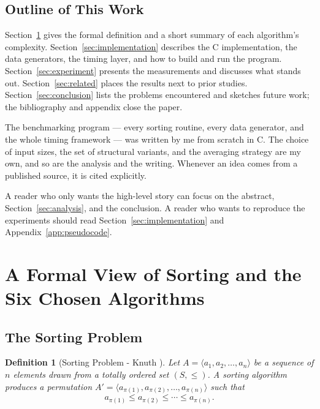 \documentclass[11pt,a4paper]{article}
\newtheorem{definition}{Definition}
\begin{document}
\subsection{Outline of This Work}

Section~\ref{sec:formal} gives the formal definition and a short summary of each algorithm's complexity. Section~\ref{sec:implementation} describes the C implementation, the data generators, the timing layer, and how to build and run the program. Section~\ref{sec:experiment} presents the measurements and discusses what stands out. Section~\ref{sec:related} places the results next to prior studies. Section~\ref{sec:conclusion} lists the problems encountered and sketches future work; the bibliography and appendix close the paper.

\medskip

\noindent The benchmarking program --- every sorting routine, every data generator, and the whole timing framework --- was written by me from scratch in C. The choice of input sizes, the set of structural variants, and the averaging strategy are my own, and so are the analysis and the writing. Whenever an idea comes from a published source, it is cited explicitly.

\medskip

\noindent A reader who only wants the high-level story can focus on the abstract, Section~\ref{sec:analysis}, and the conclusion. A reader who wants to reproduce the experiments should read Section~\ref{sec:implementation} and Appendix~\ref{app:pseudocode}.

\section{A Formal View of Sorting and the Six Chosen Algorithms}
\label{sec:formal}

\subsection{The Sorting Problem}

\begin{definition}[Sorting Problem - Knuth \cite{knuth1998}]
Let $A = \langle a_1, a_2, \ldots, a_n \rangle$ be a sequence of $n$ elements drawn from a totally ordered set $(S, \leq)$. A \emph{sorting algorithm} produces a permutation $A' = \langle a_{\pi(1)}, a_{\pi(2)}, \ldots, a_{\pi(n)} \rangle$ such that 
$$a_{\pi(1)} \leq a_{\pi(2)} \leq \cdots \leq a_{\pi(n)}.$$
\end{definition}
\end{document}
